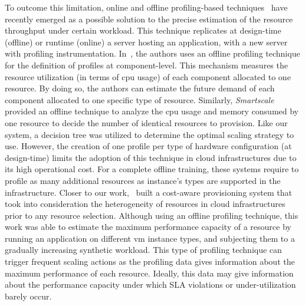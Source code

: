 


 
To outcome this limitation, online and offline profiling-based techniques~\cite{kaviani_profiling-as--service:_2011} have recently emerged as a possible solution to the precise estimation of the resource throughput under certain workload. This technique replicates at design-time (offline) or runtime (online) a server hosting an application, with a new server with profiling instrumentation. In~\cite{roy_2011}, the authors uses an offline profiling technique for the definition of profiles at component-level. This mechanism measures the resource utilization (in terms of cpu usage) of each component allocated to one resource. By doing so, the authors can estimate the future demand of each component allocated to one specific type of resource. Similarly, \emph{Smartscale}~\cite{smartscale_2012} provided an offline technique to analyze the cpu usage and memory consumed by one resource to decide the number of identical resources to provision. Like our system, a decision tree was utilized to determine the optimal scaling strategy to use. However, the creation of one profile per type of hardware configuration (at design-time) limits the adoption of this technique in cloud infrastructures due to its high operational cost. For a complete offline training, these systems require to profile as many additional resources as instance's types are supported in the infrastructure. Closer to our work,~\cite{sharma_cost-aware_2011} built a cost-aware provisioning system that took into consideration the heterogeneity of resources in cloud infrastructures prior to any resource selection. Although using an offline profiling technique, this work was able to estimate the maximum performance capacity of a resource by running an application on different vm instance types, and subjecting them to a gradually increasing synthetic workload. This type of profiling technique can trigger frequent scaling actions as the profiling data gives information about the maximum performance of each resource. Ideally, this data may give information about the performance capacity under which SLA violations or under-utilization barely occur.

